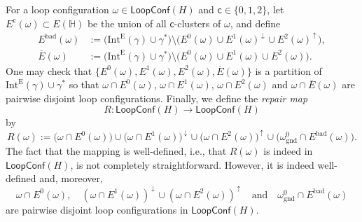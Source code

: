 \documentclass[12pt,reqno]{article}
\newcommand{\HH}{\mathbb{H}}
\newcommand{\EH}{E(\HH)}
\newcommand{\LC}{\mathsf{LoopConf}}
\newcommand{\ground}{\omega_{\operatorname{gnd}}}
\newcommand{\IntEdge}[1]{\mathrm{Int}^\mathrm{E}(#1)}
\newcommand{\BadEdges}{E^{\operatorname{bad}}}
\newcommand{\BadEdgesBefore}{\overline E}
\newcommand{\clr}{{{\mathsf{c}}}}
\newcommand{\shiftFunc}{R}
\newcommand{\shift}[1]{{\shiftFunc(#1)}}
\newcommand{\DIRup}{\,\uparrow\,}
\newcommand{\DIRdown}{\,\downarrow\,}
\begin{document}
For a loop configuration $\omega \in \LC(H)$ and $\clr \in
\{0,1,2\}$, let $E^\clr(\omega)\subset \EH$ be the union of all
$\clr$-clusters of $\omega$, and define
\begin{align}
  \label{eq:def-bad-edges}
  \BadEdges(\omega) &:= \big(\IntEdge\gamma \cup \gamma^*\big) \setminus \big( E^0(\omega) \cup E^1(\omega)^{\DIRdown} \cup E^2(\omega)^{\DIRup} \big),
\\
  \label{eq:def-bad-edges-star}
  \BadEdgesBefore(\omega) &:= \big(\IntEdge\gamma\cup\gamma^*\big)\setminus \big( E^0(\omega) \cup E^1(\omega) \cup E^2(\omega) \big).
\end{align}
One may check that $\{ E^0(\omega),
E^1(\omega), E^2(\omega), \BadEdgesBefore(\omega) \}$ is a partition
of $\IntEdge\gamma \cup \gamma^*$ so that $\omega \cap E^0(\omega)$, $\omega \cap E^1(\omega)$, $\omega \cap E^2(\omega)$ and $\omega \cap \BadEdgesBefore(\omega)$ are pairwise disjoint loop configurations.
Finally, we define the
\emph{repair map}
\[ \shiftFunc \colon \LC(H) \to \LC(H) \]
by
  \begin{equation*}
    \label{eq:def-repair-map}
      \shift\omega :=  \big(\omega \cap E^0(\omega)\big)  \cup \big(\omega \cap E^1(\omega)\big)^{\DIRdown} \cup \big(\omega \cap E^2(\omega)\big)^{\DIRup}\cup\big(\ground^0 \cap \BadEdges(\omega)\big)  .
  \end{equation*}
The fact that the mapping is well-defined, i.e., that $\shift\omega$
is indeed in $\LC(H)$, is not completely straightforward.
However, it is indeed well-defined and, moreover,
  \[ \omega \cap E^0(\omega), \quad (\omega \cap E^1(\omega))^{\DIRdown}\cup(\omega \cap E^2(\omega))^{\DIRup} \quad\text{and}\quad\ground^0 \cap \BadEdges(\omega) \]
  are pairwise disjoint loop configurations in $\LC(H)$.





%
%
\end{document}
